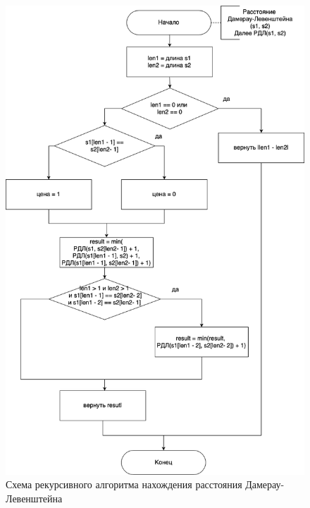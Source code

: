 \documentclass[a4paper,14pt, unknownkeysallowed]{extreport}
\begin{document}
\begin{figure}[h]
	\centering
	\includegraphics[scale=0.55]{img/dam_lev_recursion_scheme.png}
	\caption{Схема рекурсивного алгоритма нахождения расстояния Дамерау-Левенштейна}
	\label{fig:DL_rec}
\end{figure}

\clearpage
\end{document}
